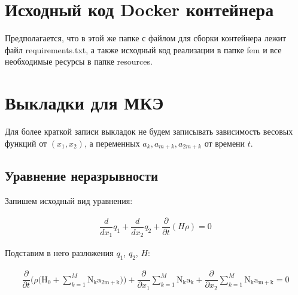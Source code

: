 \documentclass[14pt]{extreport}
\begin{document}


\chapter{Исходный код Docker контейнера}

Предполагается, что в этой же папке с файлом для сборки контейнера лежит файл requirements.txt, а также исходный код реализации в папке fem и все необходимые ресурсы в папке resources.

\begin{minipage}{\linewidth}

\end{minipage}

\begin{minipage}{\linewidth}

\end{minipage}
 
\chapter{Выкладки для МКЭ}

 Для более краткой записи выкладок не будем записывать зависимость весовых функций от $(x_1, x_2)$, а переменных $a_k, a_{m+k}, a_{2m+k}$ от времени $t$.

\section{Уравнение неразрывности}

Запишем исходный вид уравнения:

\begin{eqnarray}
\dfrac{d}{d x_{1}} q_{1} + \dfrac{d}{d x_{2}} q_{2} + \dfrac{\partial}{\partial t}\left(H \rho\right) = 0
\end{eqnarray}


Подставим в него разложения $q_1$, $q_2$, $H$:

\begin{multline*}
\dfrac{\partial}{\partial t}\bigg(\rho \bigg(\operatorname{H_{0}}+ \sum_{k=1}^{M} \operatorname{N_{k}} \operatorname{a_{2m+k}}\bigg)\bigg)+\dfrac{\partial}{\partial x_{1}} \sum_{k=1}^{M} \operatorname{N_{k}} \operatorname{a_{k}} + \dfrac{\partial}{\partial x_{2}} \sum_{k=1}^{M} \operatorname{N_{k}} \operatorname{a_{m+k}}=0
\end{multline*}
\end{document}
